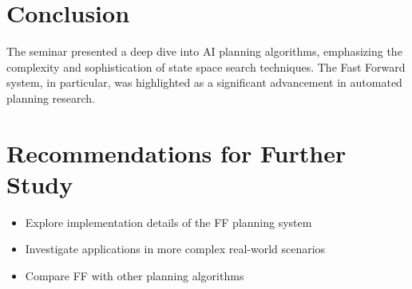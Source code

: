 \documentclass[12pt]{article}
\begin{document}
\section{Conclusion}
The seminar presented a deep dive into AI planning algorithms, emphasizing the complexity and sophistication of state space search techniques. The Fast Forward system, in particular, was highlighted as a significant advancement in automated planning research.

\section{Recommendations for Further Study}
\begin{itemize}
    \item Explore implementation details of the FF planning system
    \item Investigate applications in more complex real-world scenarios
    \item Compare FF with other planning algorithms
\end{itemize}
\end{document}
